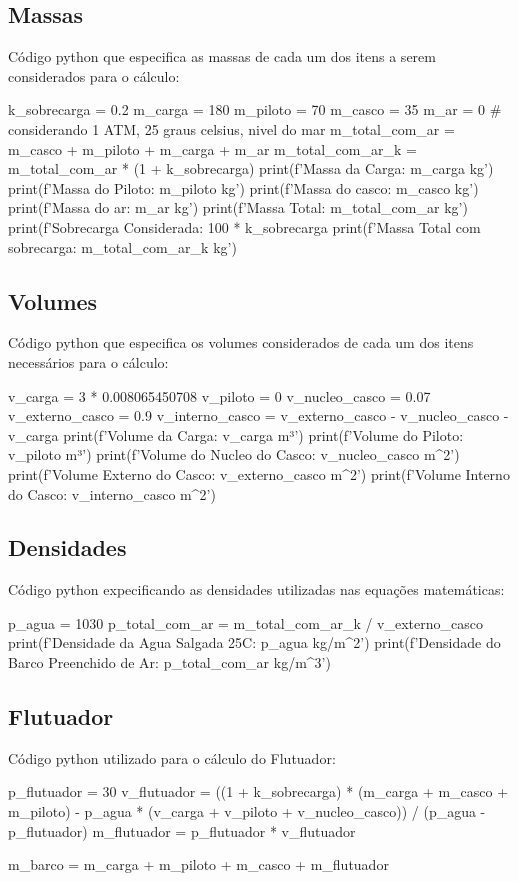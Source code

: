 \documentclass[a4paper]{article}
\begin{document}
\subsection{Massas}
Código python que especifica as massas de cada um dos itens a serem considerados para o cálculo:
\begin{python}
k_sobrecarga = 0.2
m_carga = 180
m_piloto = 70
m_casco = 35
m_ar = 0 # considerando 1 ATM, 25 graus celsius, nivel do mar
m_total_com_ar = m_casco + m_piloto + m_carga + m_ar
m_total_com_ar_k = m_total_com_ar * (1 + k_sobrecarga)
print(f'Massa da Carga: {m_carga} kg')
print(f'Massa do Piloto: {m_piloto} kg')
print(f'Massa do casco: {m_casco} kg')
print(f'Massa do ar: {m_ar} kg')
print(f'Massa Total: {m_total_com_ar} kg')
print(f'Sobrecarga Considerada: {100 * k_sobrecarga} %
print(f'Massa Total com sobrecarga: {m_total_com_ar_k} kg\n')
\end{python}

\subsection{Volumes}
Código python que especifica os volumes considerados de cada um dos itens necessários para o cálculo:
\begin{python}
v_carga = 3 * 0.008065450708
v_piloto = 0
v_nucleo_casco = 0.07
v_externo_casco = 0.9
v_interno_casco = v_externo_casco - v_nucleo_casco - v_carga
print(f'Volume da Carga: {v_carga} m³')
print(f'Volume do Piloto: {v_piloto} m³')
print(f'Volume do Nucleo do Casco: {v_nucleo_casco} m^2')
print(f'Volume Externo do Casco: {v_externo_casco} m^2')
print(f'Volume Interno do Casco: {v_interno_casco} m^2\n')
\end{python}

\subsection{Densidades}
Código python expecificando as densidades utilizadas nas equações matemáticas:
\begin{python}
p_agua = 1030
p_total_com_ar = m_total_com_ar_k / v_externo_casco
print(f'Densidade da Agua Salgada 25C: {p_agua} kg/m^2')
print(f'Densidade do Barco Preenchido de Ar: {p_total_com_ar} kg/m^3\n')
\end{python}

\subsection{Flutuador}
Código python utilizado para o cálculo do Flutuador:
\begin{python}
p_flutuador = 30
v_flutuador = ((1 + k_sobrecarga) * (m_carga + m_casco + m_piloto) - p_agua * (v_carga + v_piloto + v_nucleo_casco)) / (p_agua - p_flutuador)
m_flutuador = p_flutuador * v_flutuador

m_barco = m_carga + m_piloto + m_casco + m_flutuador
\end{python}
\end{document}
